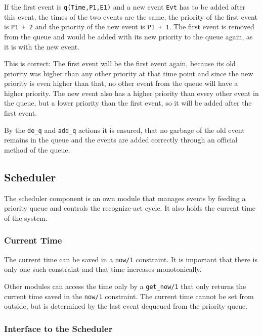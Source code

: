 If the first event is \lstinline|q(Time,P1,E1)| and a new event \lstinline|Evt| has to be added after this event, the times of the two events are the same, the priority of the first event is \lstinline|P1 + 2| and the priority of the new event is \lstinline|P1 + 1|. The first event is removed from the queue and would be added with its new priority to the queue again, as it is with the new event. 

This is correct: The first event will be the first event again, because its old priority was higher than any other priority at that time point and since the new priority is even higher than that, no other event from the queue will have a higher priority. The new event also has a higher priority than every other event in the queue, but a lower priority than the first event, so it will be added after the first event.

By the \lstinline|de_q| and \lstinline|add_q| actions it is ensured, that no garbage of the old event remains in the queue and the events are added correctly through an official method of the queue.

\subsection{Scheduler}
\label{implementation:scheduler}

The scheduler component is an own module that manages events by feeding a priority queue and controls the recognize-act cycle. It also holds the current time of the system. 

\subsubsection{Current Time}

The current time can be saved in a \lstinline|now/1| constraint. It is important that there is only one such constraint and that time increases monotonically.

Other modules can access the time only by a \lstinline|get_now/1| that only returns the current time saved in the \lstinline|now/1| constraint. The current time cannot be set from outside, but is determined by the last event dequeued from the priority queue.

\subsubsection{Interface to the Scheduler}

